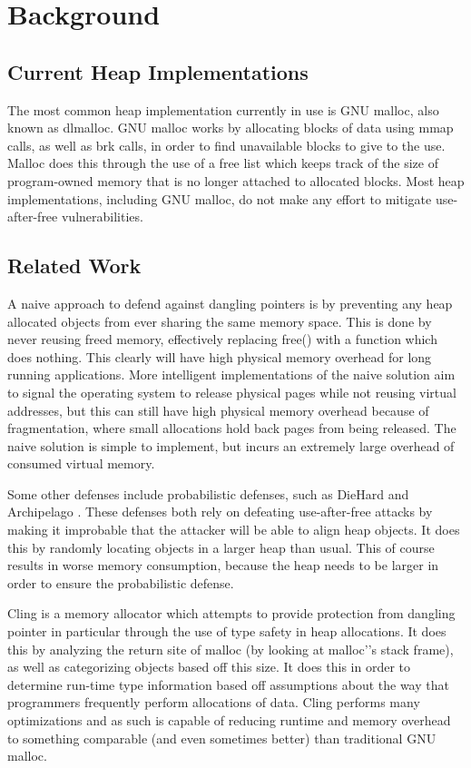 \documentclass[conference]{IEEEtran}
\begin{document}
\section{Background}

\subsection{Current Heap Implementations}
The most common heap implementation currently in use is GNU malloc, also 
known as dlmalloc. GNU malloc works by allocating blocks of data using mmap 
calls, as well as brk calls, in order to find unavailable blocks to give to 
the use. Malloc does this through the use of a free list which keeps track 
of the size of program-owned memory that is no longer attached to allocated 
blocks.  Most heap implementations, including GNU malloc, do not make any effort to mitigate use-after-free vulnerabilities. 

\subsection{Related Work}
A naive approach to defend against dangling pointers is by preventing any 
heap allocated objects from ever sharing the same memory space. This is done 
by never reusing freed memory, effectively replacing free() with a function 
which does nothing. This clearly will have high physical memory overhead for long running applications. More intelligent implementations of the naive solution aim to signal the operating system to release physical pages while not reusing virtual addresses, but this can still have high physical memory overhead because of fragmentation, where small allocations hold back pages from being released.  The naive solution is simple to implement, but incurs an extremely large overhead of consumed virtual memory.

Some other defenses include probabilistic defenses, such as DieHard \cite{b2}
and Archipelago \cite{b3}. These defenses both rely on defeating 
use-after-free attacks by making it improbable that the attacker will be able 
to align heap objects. It does this by randomly locating objects in a larger 
heap than usual. This of course results in worse memory consumption, because 
the heap needs to be larger in order to ensure the probabilistic defense.

Cling \cite{b1} is a memory allocator which attempts to provide protection 
from dangling pointer in particular through the use of type safety in heap 
allocations. It does this by analyzing the return site of malloc (by looking 
at malloc'’s stack frame), as well as categorizing objects based off this size. 
It does this in order to determine run-time type information based off 
assumptions about the way that programmers frequently perform allocations of data. Cling performs many optimizations and as such is capable of 
reducing runtime and memory overhead to something comparable (and even 
sometimes better) than traditional GNU malloc. 
\end{document}
